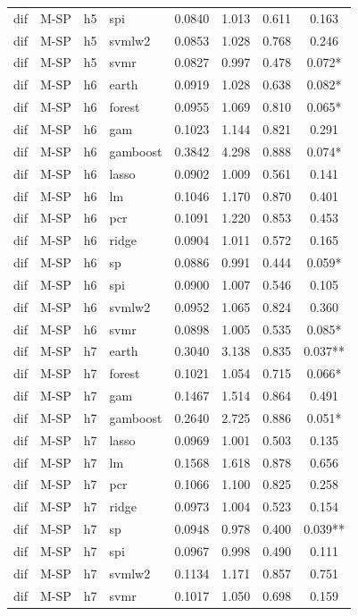 \begin{ThreePartTable}
\begin{longtable}[t]{llclcccc}
dif & M-SP & h5 & spi & 0.0840 & 1.013 & 0.611 & 0.163\\
dif & M-SP & h5 & svmlw2 & 0.0853 & 1.028 & 0.768 & 0.246\\
dif & M-SP & h5 & svmr & 0.0827 & 0.997 & 0.478 & 0.072*\\
\addlinespace
dif & M-SP & h6 & earth & 0.0919 & 1.028 & 0.638 & 0.082*\\
dif & M-SP & h6 & forest & 0.0955 & 1.069 & 0.810 & 0.065*\\
dif & M-SP & h6 & gam & 0.1023 & 1.144 & 0.821 & 0.291\\
dif & M-SP & h6 & gamboost & 0.3842 & 4.298 & 0.888 & 0.074*\\
dif & M-SP & h6 & lasso & 0.0902 & 1.009 & 0.561 & 0.141\\
dif & M-SP & h6 & lm & 0.1046 & 1.170 & 0.870 & 0.401\\
dif & M-SP & h6 & pcr & 0.1091 & 1.220 & 0.853 & 0.453\\
dif & M-SP & h6 & ridge & 0.0904 & 1.011 & 0.572 & 0.165\\
dif & M-SP & h6 & sp & 0.0886 & 0.991 & 0.444 & 0.059*\\
dif & M-SP & h6 & spi & 0.0900 & 1.007 & 0.546 & 0.105\\
dif & M-SP & h6 & svmlw2 & 0.0952 & 1.065 & 0.824 & 0.360\\
dif & M-SP & h6 & svmr & 0.0898 & 1.005 & 0.535 & 0.085*\\
\addlinespace
dif & M-SP & h7 & earth & 0.3040 & 3.138 & 0.835 & 0.037**\\
dif & M-SP & h7 & forest & 0.1021 & 1.054 & 0.715 & 0.066*\\
dif & M-SP & h7 & gam & 0.1467 & 1.514 & 0.864 & 0.491\\
dif & M-SP & h7 & gamboost & 0.2640 & 2.725 & 0.886 & 0.051*\\
dif & M-SP & h7 & lasso & 0.0969 & 1.001 & 0.503 & 0.135\\
dif & M-SP & h7 & lm & 0.1568 & 1.618 & 0.878 & 0.656\\
dif & M-SP & h7 & pcr & 0.1066 & 1.100 & 0.825 & 0.258\\
dif & M-SP & h7 & ridge & 0.0973 & 1.004 & 0.523 & 0.154\\
dif & M-SP & h7 & sp & 0.0948 & 0.978 & 0.400 & 0.039**\\
dif & M-SP & h7 & spi & 0.0967 & 0.998 & 0.490 & 0.111\\
dif & M-SP & h7 & svmlw2 & 0.1134 & 1.171 & 0.857 & 0.751\\
dif & M-SP & h7 & svmr & 0.1017 & 1.050 & 0.698 & 0.159\\

\end{longtable}
\end{ThreePartTable}
